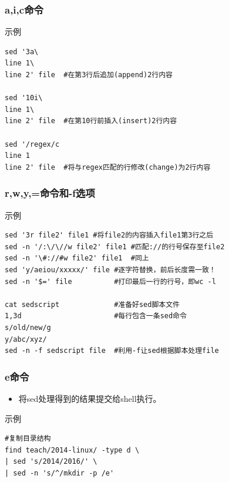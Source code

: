 \documentclass[xcolor=svgnames,presentation]{beamer}
\begin{document}
\begin{frame}[fragile]
\frametitle{a,i,c命令}
\label{sec-2-1-8}
\begin{exampleblock}{示例}
\label{sec-2-1-8-1}


\begin{verbatim}
sed '3a\
line 1\
line 2' file  #在第3行后追加(append)2行内容

sed '10i\
line 1\
line 2' file  #在第10行前插入(insert)2行内容

sed '/regex/c
line 1
line 2' file  #将与regex匹配的行修改(change)为2行内容
\end{verbatim}
\end{exampleblock}
\end{frame}
\begin{frame}[fragile]
\frametitle{r,w,y,=命令和-f选项}
\label{sec-2-1-9}
\begin{exampleblock}{示例}
\label{sec-2-1-9-1}


\begin{verbatim}
sed '3r file2' file1 #将file2的内容插入file1第3行之后
sed -n '/:\/\//w file2' file1 #匹配://的行号保存至file2
sed -n '\#://#w file2' file1  #同上
sed 'y/aeiou/xxxxx/' file #逐字符替换，前后长度需一致！
sed -n '$=' file          #打印最后一行的行号，即wc -l

cat sedscript             #准备好sed脚本文件
1,3d                      #每行包含一条sed命令
s/old/new/g
y/abc/xyz/
sed -n -f sedscript file  #利用-f让sed根据脚本处理file
\end{verbatim}
\end{exampleblock}
\end{frame}
\begin{frame}[fragile]
\frametitle{e命令}
\label{sec-2-1-10}
\begin{itemize}

\item 将sed处理得到的结果提交给shell执行。
\label{sec-2-1-10-1}%
\end{itemize} %
\begin{exampleblock}{示例}
\label{sec-2-1-10-2}


\begin{verbatim}
#复制目录结构
find teach/2014-linux/ -type d \
| sed 's/2014/2016/' \
| sed -n 's/^/mkdir -p /e'
\end{verbatim}
\end{exampleblock}
\end{frame}
\end{document}
